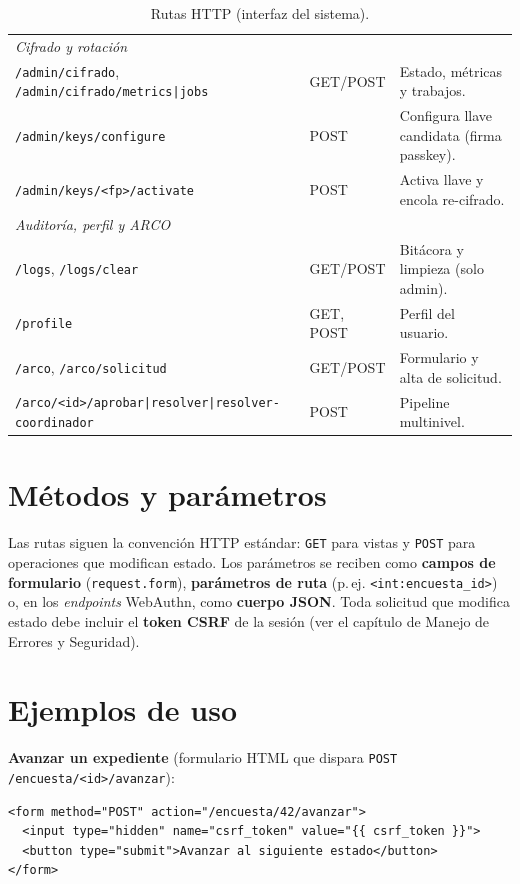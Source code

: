 \documentclass[10pt,letterpaper]{report}
\begin{document}
\begin{table}[h]
\begin{tabularx}{\textwidth}{l l X}
\midrule
\multicolumn{3}{l}{\textit{Cifrado y rotaci\'on}}\\
\texttt{/admin/cifrado}, \texttt{/admin/cifrado/metrics|jobs} & GET/POST & Estado, m\'etricas y trabajos. \\
\texttt{/admin/keys/configure} & POST & Configura llave candidata (firma passkey). \\
\texttt{/admin/keys/<fp>/activate} & POST & Activa llave y encola re-cifrado. \\
\midrule
\multicolumn{3}{l}{\textit{Auditor\'ia, perfil y ARCO}}\\
\texttt{/logs}, \texttt{/logs/clear} & GET/POST & Bit\'acora y limpieza (solo admin). \\
\texttt{/profile} & GET, POST & Perfil del usuario. \\
\texttt{/arco}, \texttt{/arco/solicitud} & GET/POST & Formulario y alta de solicitud. \\
\texttt{/arco/<id>/aprobar|resolver|resolver-coordinador} & POST & Pipeline multinivel. \\
\bottomrule
\end{tabularx}
\caption{Rutas HTTP (interfaz del sistema).}
\label{tab:rutas}
\end{table}

\section{M\'etodos y par\'ametros}
Las rutas siguen la convenci\'on HTTP est\'andar: \texttt{GET} para vistas y \texttt{POST} para
operaciones que modifican estado. Los par\'ametros se reciben como \textbf{campos de formulario}
(\texttt{request.form}), \textbf{par\'ametros de ruta} (p.\,ej. \texttt{<int:encuesta\_id>}) o, en los
\emph{endpoints} WebAuthn, como \textbf{cuerpo JSON}. Toda solicitud que modifica estado debe incluir
el \textbf{token CSRF} de la sesi\'on (ver el cap\'itulo de Manejo de Errores y Seguridad).

\section{Ejemplos de uso}
\textbf{Avanzar un expediente} (formulario HTML que dispara \texttt{POST /encuesta/<id>/avanzar}):
\begin{lstlisting}[style=plain]
<form method="POST" action="/encuesta/42/avanzar">
  <input type="hidden" name="csrf_token" value="{{ csrf_token }}">
  <button type="submit">Avanzar al siguiente estado</button>
</form>
\end{lstlisting}
\end{document}
